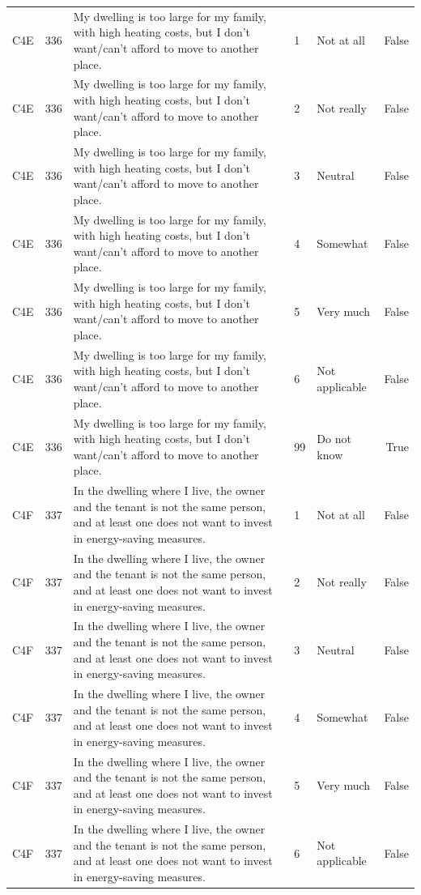 \begin{tabular}{lrlllr}
C4E & 336 & My dwelling is too large for my family, with high heating costs, but I don’t want/can’t afford to move to another place. & 1 & Not at all & False \\
C4E & 336 & My dwelling is too large for my family, with high heating costs, but I don’t want/can’t afford to move to another place. & 2 & Not really & False \\
C4E & 336 & My dwelling is too large for my family, with high heating costs, but I don’t want/can’t afford to move to another place. & 3 & Neutral & False \\
C4E & 336 & My dwelling is too large for my family, with high heating costs, but I don’t want/can’t afford to move to another place. & 4 & Somewhat & False \\
C4E & 336 & My dwelling is too large for my family, with high heating costs, but I don’t want/can’t afford to move to another place. & 5 & Very much & False \\
C4E & 336 & My dwelling is too large for my family, with high heating costs, but I don’t want/can’t afford to move to another place. & 6 & Not applicable & False \\
C4E & 336 & My dwelling is too large for my family, with high heating costs, but I don’t want/can’t afford to move to another place. & 99 & Do not know & True \\
C4F & 337 & In the dwelling where I live, the owner and the tenant is not the same person, and at least one does not want to invest in energy-saving measures. & 1 & Not at all & False \\
C4F & 337 & In the dwelling where I live, the owner and the tenant is not the same person, and at least one does not want to invest in energy-saving measures. & 2 & Not really & False \\
C4F & 337 & In the dwelling where I live, the owner and the tenant is not the same person, and at least one does not want to invest in energy-saving measures. & 3 & Neutral & False \\
C4F & 337 & In the dwelling where I live, the owner and the tenant is not the same person, and at least one does not want to invest in energy-saving measures. & 4 & Somewhat & False \\
C4F & 337 & In the dwelling where I live, the owner and the tenant is not the same person, and at least one does not want to invest in energy-saving measures. & 5 & Very much & False \\
C4F & 337 & In the dwelling where I live, the owner and the tenant is not the same person, and at least one does not want to invest in energy-saving measures. & 6 & Not applicable & False \\

\end{tabular}
